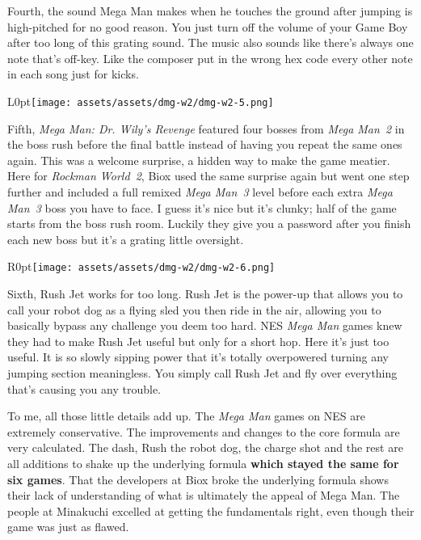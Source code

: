 \documentclass{book}
\begin{document}
Fourth, the sound Mega Man makes when he touches the ground after jumping is high-pitched for no good reason. You just turn off the volume of your Game Boy after too long of this grating sound. The music also sounds like there’s always one note that’s off-key. Like the composer put in the wrong hex code every other note in each song just for kicks.\par
\begin{wrapfigure}{L}{0pt}{\texttt{[image: assets/assets/dmg-w2/dmg-w2-5.png]}}\end{wrapfigure}\noindent
Fifth, \emph{Mega Man: Dr. Wily’s Revenge} featured four bosses from \emph{Mega Man~2} in the boss rush before the final battle instead of having you repeat the same ones again. This was a welcome surprise, a hidden way to make the game meatier. Here for \emph{Rockman World~2}, Biox used the same surprise again but went one step further and included a full remixed \emph{Mega Man~3} level before each extra \emph{Mega Man~3} boss you have to face. I guess it’s nice but it’s clunky; half of the game starts from the boss rush room. Luckily they give you a password after you finish each new boss but it’s a grating little oversight.\par
\begin{wrapfigure}{R}{0pt}{\texttt{[image: assets/assets/dmg-w2/dmg-w2-6.png]}}\end{wrapfigure}
Sixth, Rush Jet works for too long. Rush Jet is the power-up that allows you to call your robot dog as a flying sled you then ride in the air, allowing you to basically bypass any challenge you deem too hard. NES \emph{Mega Man} games knew they had to make Rush Jet useful but only for a short hop. Here it’s just too useful. It is so slowly sipping power that it’s totally overpowered turning any jumping section meaningless. You simply call Rush Jet and fly over everything that’s causing you any trouble.\par
To me, all those little details add up. The \emph{Mega Man} games on NES are extremely conservative. The improvements and changes to the core formula are very calculated. The dash, Rush the robot dog, the charge shot and the rest are all additions to shake up the underlying formula \textbf{which stayed the same for six games}. That the developers at Biox broke the underlying formula shows their lack of understanding of what is ultimately the appeal of Mega Man. The people at Minakuchi excelled at getting the fundamentals right, even though their game was just as flawed.\par
\end{document}
